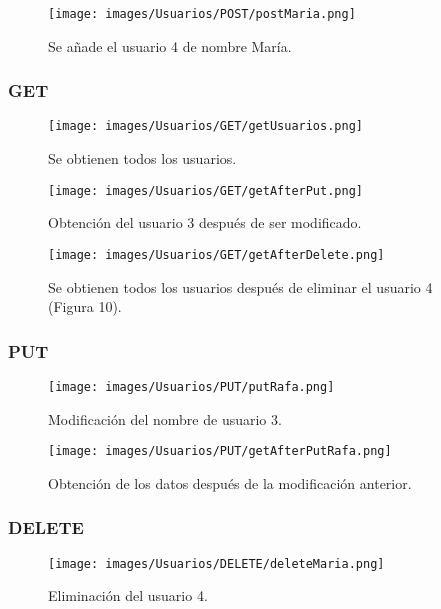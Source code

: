 \documentclass[12pt,a4paper, spanish]{article}
\begin{document}
\begin{figure}[H]
	\centering
	\texttt{[image: images/Usuarios/POST/postMaria.png]}
	\caption{Se añade el usuario 4 de nombre María.}
\end{figure}
\newpage
\subsubsection{GET}

\begin{figure}[H]
	\centering
	\texttt{[image: images/Usuarios/GET/getUsuarios.png]}
	\caption{Se obtienen todos los usuarios.}
\end{figure}

\begin{figure}[H]
	\centering
	\texttt{[image: images/Usuarios/GET/getAfterPut.png]}
	\caption{Obtención del usuario 3 después de ser modificado.}
\end{figure}

\begin{figure}[H]
	\centering
	\texttt{[image: images/Usuarios/GET/getAfterDelete.png]}
	\caption{Se obtienen todos los usuarios después de eliminar el usuario 4 (Figura 10).}
\end{figure}

\subsubsection{PUT}
\begin{figure}[H]
	\centering
	\texttt{[image: images/Usuarios/PUT/putRafa.png]}
	\caption{Modificación del nombre de usuario 3.}
\end{figure}

\begin{figure}[H]
	\centering
	\texttt{[image: images/Usuarios/PUT/getAfterPutRafa.png]}
	\caption{Obtención de los datos después de la modificación anterior.}
\end{figure}

\subsubsection{DELETE}
\begin{figure}[H]
	\centering
	\texttt{[image: images/Usuarios/DELETE/deleteMaria.png]}
	\caption{Eliminación del usuario 4.}
\end{figure}
\newpage
\end{document}
